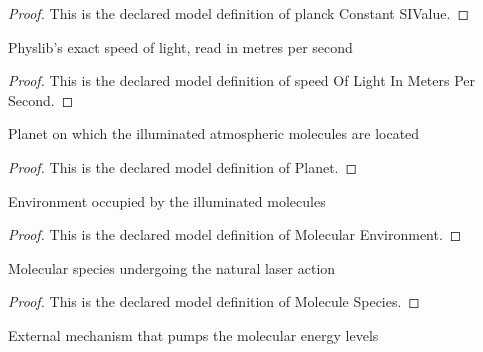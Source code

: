 \begin{proof}
  This is the declared model definition of planck Constant SIValue.
\end{proof}
\begin{definition}
  \label{def:physics:phyx-mini-0579:phyxminiproblems-problemphyxmini0579-speedoflightinmeterspersecond}
  Physlib's exact speed of light, read in metres per second
\end{definition}
\begin{proof}
  This is the declared model definition of speed Of Light In Meters Per Second.
\end{proof}
\begin{definition}[Planet]
  \label{def:physics:phyx-mini-0579:phyxminiproblems-problemphyxmini0579-planet}
  Planet on which the illuminated atmospheric molecules are located
\end{definition}
\begin{proof}
  This is the declared model definition of Planet.
\end{proof}
\begin{definition}
  \label{def:physics:phyx-mini-0579:phyxminiproblems-problemphyxmini0579-molecularenvironment}
  Environment occupied by the illuminated molecules
\end{definition}
\begin{proof}
  This is the declared model definition of Molecular Environment.
\end{proof}
\begin{definition}
  \label{def:physics:phyx-mini-0579:phyxminiproblems-problemphyxmini0579-moleculespecies}
  Molecular species undergoing the natural laser action
\end{definition}
\begin{proof}
  This is the declared model definition of Molecule Species.
\end{proof}
\begin{definition}
  \label{def:physics:phyx-mini-0579:phyxminiproblems-problemphyxmini0579-pumpsource}
  External mechanism that pumps the molecular energy levels
\end{definition}
